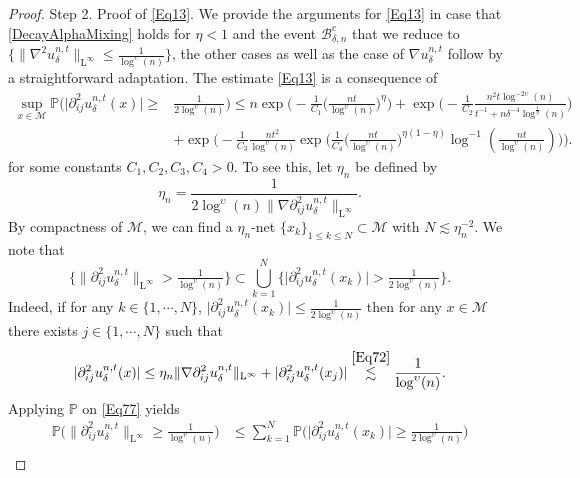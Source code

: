 \documentclass[11pt,a4paper,oneside]{amsart}
\numberwithin{equation}{section}
\newcommand{\LL}{\mathrm{L}}
\begin{document}
\begin{proof}
{\sc Step 2. Proof of \eqref{Eq13}. }We provide the arguments for \eqref{Eq13} in case that \eqref{DecayAlphaMixing} holds for $\eta<1$ and the event $\mathcal{B}^c_{\delta,n}$ that we reduce to $\{\|\nabla^2 u^{n,t}_\delta\|_{\LL^{\infty}}\leq \tfrac{1}{\log^{\upsilon}(n)}\}$, the other cases as well as the case of $\nabla u^{n,t}_\delta$ follow by a straightforward adaptation. The estimate \eqref{Eq13} is a consequence of 
%
\begin{equation}\label{Eq59}
\begin{aligned}
\sup_{x\in\mathcal{M}}\mathbb{P}\Big(\vert\partial^2_{ij} u^{n,t}_{\delta}(x)\vert\geq& \tfrac{1}{2\log^{\upsilon}(n)}\Big)\leq n\exp\bigg(-\frac{1}{C_1}\Big(\frac{nt}{\log^{\upsilon}(n)}\Big)^{\eta}\bigg)+\exp\bigg(-\frac{1}{C_2}\frac{n^2t\log^{-2\upsilon}(n)}{t^{-1}+n\delta^{-4}\log^{\frac{1}{\eta}}(n)}\bigg)\\
&+\exp\bigg(-\frac{1}{C_3}\frac{nt^2}{\log^{\upsilon}(n)}\exp\Big(\frac{1}{C_4}\Big(\frac{nt}{\log^{\upsilon}(n)}\Big)^{\eta(1-\eta)}\log^{-1}(\tfrac{nt}{\log^{\upsilon}(n)})\Big)\bigg).
\end{aligned}
\end{equation}
% 
for some constants $C_1,C_2,C_3,C_4>0$. To see this, let $\eta_n$ be defined by
%
\begin{equation}\label{Eq72}
\eta_n=\frac{1}{2\log^{\upsilon}(n)\|\nabla\partial^2_{ij}u^{n,t}_{\delta}\|_{\LL^{\infty}}}.
\end{equation}
%
By compactness of $\mathcal{M}$, we can find a $\eta_n$-net $\{x_k\}_{1\leq k\leq N}\subset \mathcal{M}$ with $N\lesssim \eta^{-2}_n$. We note that
%
\begin{equation}\label{Eq77}
\Big\{\|\partial^2_{ij}u^{n,t}_{\delta}\|_{\LL^{\infty}}>\tfrac{1}{\log^{\upsilon}(n)}\Big\}\subset\bigcup_{k=1}^{N}\Big\{\vert\partial^2_{ij}u^{n,t}_{\delta}(x_k)\vert>\tfrac{1}{2\log^{\upsilon}(n)}\Big\}.
\end{equation}
%
Indeed, if for any $k\in\{1,\cdots,N\}$, $\vert\partial^2_{ij}u^{n,t}_{\delta}(x_k)\vert\leq\tfrac{1}{2\log^{\upsilon}(n)}$ then for any $x\in \mathcal{M}$ there exists $j\in\{1,\cdots,N\}$ such that
%
$$\vert\partial^2_{ij}u^{n,t}_{\delta}(x)\vert\leq \eta_n\|\nabla\partial^2_{ij}u^{n,t}_{\delta}\|_{\LL^{\infty}}+\vert\partial^2_{ij}u^{n,t}_{\delta}(x_j)\vert\stackrel{\eqref{Eq72}}{\lesssim} \frac{1}{\log^{\upsilon}(n)}.$$
%
Applying $\mathbb{P}$ on \eqref{Eq77} yields 
%
\begin{align*}
\mathbb{P}\Big(\|\partial^2_{ij} u^{n,t}_{\delta}\|_{\LL^{\infty}}\geq \tfrac{1}{\log^{\upsilon}(n)}\Big)&\leq \sum_{k=1}^N\mathbb{P}\Big(\vert\partial^2_{ij} u^{n,t}_{\delta}(x_k)\vert\geq \tfrac{1}{2\log^{\upsilon}(n)}\Big)\\

\end{align*}
\end{proof}
\end{document}
